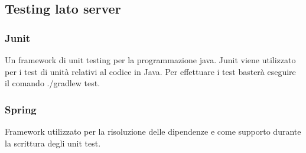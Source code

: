 \subsection{Testing lato server}
\subsubsection{Junit}
Un framework di unit testing per la programmazione java. Junit viene utilizzato per i test di unità relativi al codice in Java.
Per effettuare i test basterà eseguire il comando ./gradlew test.

\subsubsection{Spring}
Framework utilizzato per la risoluzione delle dipendenze e come supporto durante la scrittura degli unit test.